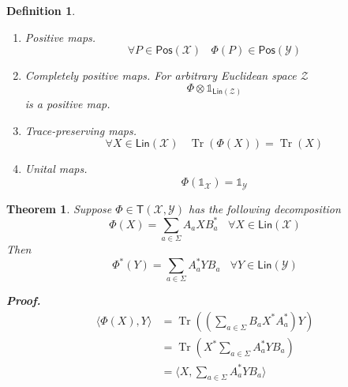 \documentclass[aps,pra,onecolumn,notitlepage,superscriptaddress]{revtex4-1}
\newcommand{\spc}[1]{\mathcal{#1}}
\newcommand{\Lin}{\mathsf{Lin}}
\newcommand{\Pos}{\mathsf{Pos}}
\newcommand{\T}{\mathsf{T}}
\def\>{\rangle}
\def\<{\langle}
\newcommand{\Tr}{\operatorname{Tr}}
\newcommand\I{\mathds{1}}
\newtheorem{theo}{Theorem}
\newtheorem{defi}{Definition}
\def\Proof{{\bf Proof.~}}
\begin{document}
\begin{defi}
\begin{itemize}
\begin{enumerate}
                \item Positive maps. 
                    \begin{equation*}
                        \forall P \in \Pos(\spc X) \ \ \ \ \Phi(P) \in \Pos(\spc Y)
                    \end{equation*}
                \item Completely positive maps. For arbitrary Euclidean space $\spc Z$
                    \begin{equation*}
                        \Phi \otimes \I_{\Lin(\spc Z)}
                    \end{equation*}
                is a positive map.
                \item Trace-preserving maps.
                    \begin{equation*}
                        \forall X \in \Lin(\spc X) \ \ \ \ \Tr(\Phi(X)) = \Tr(X)
                    \end{equation*}
                \item Unital maps.
                    \begin{equation*}
                        \Phi(\I_{\spc X}) = \I_{\spc Y}
                    \end{equation*}
            \end{enumerate}
        \end{itemize}
    \end{defi}

    \begin{theo}
        Suppose $\Phi \in \T(\spc X, \spc Y)$ has the following decomposition
        \begin{equation}
            \Phi(X) = \sum_{a \in \Sigma} A_a X B_a^* \ \ \ \ \forall X \in \Lin(\spc X)
        \end{equation}
        Then
        \begin{equation}
            \Phi^*(Y) = \sum_{a \in \Sigma} A_a^* Y B_a \ \ \ \ \forall Y \in \Lin(\spc Y)
        \end{equation}

        \Proof {
            \begin{align}
                \< \Phi(X), Y \>
                &= \Tr( (\sum_{a \in \Sigma} B_a X^* A_a^*) Y ) \\
                &= \Tr( X^* \sum_{a \in \Sigma} A_a^* Y B_a ) \\
                &= \< X, \sum_{a \in \Sigma} A_a^* Y B_a \>
            \end{align}
        }
    \end{theo}
\end{document}
